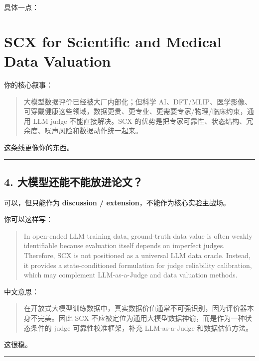 \documentclass[
  12pt,
]{ctexart}
\begin{document}
具体一点：

\section{\texorpdfstring{\textbf{SCX for Scientific and Medical Data
Valuation}}{SCX for Scientific and Medical Data Valuation}}\label{scx-for-scientific-and-medical-data-valuation}

你的核心叙事：

\begin{quote}
大模型数据评价已经被大厂内部化；但科学
AI、DFT/MLIP、医学影像、可穿戴健康这些领域，数据更贵、更专业、更需要专家/物理/临床约束，通用
LLM judge 不能直接解决。SCX
的优势是把专家可靠性、状态结构、冗余度、噪声风险和数据动作统一起来。
\end{quote}

这条线更像你的东西。

\begin{center}\rule{0.5\linewidth}{0.5pt}\end{center}

\subsection{4.
大模型还能不能放进论文？}\label{ux5927ux6a21ux578bux8fd8ux80fdux4e0dux80fdux653eux8fdbux8bbaux6587}

可以，但只能作为 \textbf{discussion /
extension}，不能作为核心实验主战场。

你可以这样写：

\begin{quote}
In open-ended LLM training data, ground-truth data value is often weakly
identifiable because evaluation itself depends on imperfect judges.
Therefore, SCX is not positioned as a universal LLM data oracle.
Instead, it provides a state-conditioned formulation for judge
reliability calibration, which may complement LLM-as-a-Judge and data
valuation methods.
\end{quote}

中文意思：

\begin{quote}
在开放式大模型训练数据中，真实数据价值通常不可强识别，因为评价器本身不完美。因此
SCX 不应被定位为通用大模型数据神谕，而是作为一种状态条件的 judge
可靠性校准框架，补充 LLM-as-a-Judge 和数据估值方法。
\end{quote}

这很稳。

\begin{center}\rule{0.5\linewidth}{0.5pt}\end{center}
\end{document}
